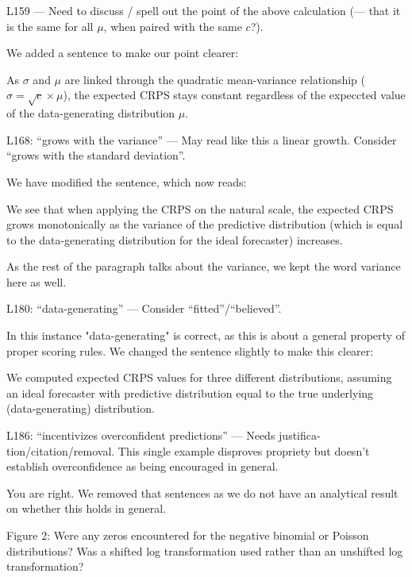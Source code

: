 \documentclass{article}
\newcommand{\black}{\color{black}}
\newcommand{\blue}{\color{blue}}
\newcommand{\indented}{\setlength{\leftskip}{1cm}}
\newcommand{\notindented}{\setlength{\leftskip}{0cm}}
\begin{document}
\notindented



\blue
L159 — Need to discuss / spell out the point of the above calculation (— that it is the same for all $\mu$, when paired with the same $c$?).

\black
We added a sentence to make our point clearer: 

\indented
As $\sigma$ and $\mu$ are linked through the quadratic mean-variance relationship ($\sigma = \sqrt{c} \times \mu$), the expected CRPS stays constant regardless of the expeccted value of the data-generating distribution $\mu$. 

\notindented

\blue
L168: “grows with the variance” — May read like this a linear growth. Consider “grows with the standard deviation”.

\black
We have modified the sentence, which now reads: 

\indented
We see that when applying the CRPS on the natural scale, the expected CRPS grows monotonically as the variance of the predictive distribution (which is equal to the data-generating distribution for the ideal forecaster) increases.

\notindented
As the rest of the paragraph talks about the variance, we kept the word variance here as well. 

\blue

L180: “data-generating” — Consider “fitted”/“believed”.

\black
In this instance "data-generating" is correct, as this is about a general property of proper scoring rules. We changed the sentence slightly to make this clearer: 

\indented
We computed expected CRPS values  for three different distributions, assuming an ideal forecaster with predictive distribution equal to the true underlying (data-generating) distribution.


\notindented
\blue
L186: “incentivizes overconfident predictions” — Needs justifica- tion/citation/removal. This single example disproves propriety but doesn’t establish overconfidence as being encouraged in general.

\black
You are right. We removed that sentences as we do not have an analytical result on whether this holds in general. 

\blue
Figure 2: Were any zeros encountered for the negative binomial or Poisson distributions? Was a shifted log transformation used rather than an unshifted log transformation?
\end{document}
